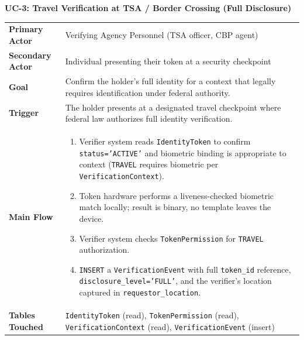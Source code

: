 \documentclass[11pt,letterpaper]{article}
\newcommand{\entity}[1]{\texttt{\color{navydark}#1}}
\newcommand{\usecase}[2]{%
  \needspace{3\baselineskip}%
  \vspace{6pt}%
  \noindent\colorbox{tabheader}{\parbox{\dimexpr\textwidth-2\fboxsep}{%
    \color{white}\small\bfseries\textsc{#1:} \mdseries #2}}%
  \nopagebreak[4]%
  \vspace{2pt}%
  \nopagebreak[4]%
}
\begin{document}
\usecase{UC-3}{Travel Verification at TSA / Border Crossing (Full Disclosure)}
\noindent\begin{xltabular}{\textwidth}{>{\bfseries}p{1.4in} >{\RaggedRight\arraybackslash}X}
Primary Actor & Verifying Agency Personnel (TSA officer, CBP agent) \\
Secondary Actor & Individual presenting their token at a security checkpoint \\
Goal & Confirm the holder's full identity for a context that legally requires identification under federal authority. \\
Trigger & The holder presents at a designated travel checkpoint where federal law authorizes full identity verification. \\
Main Flow &
\begin{enumerate}
  \item Verifier system reads \entity{IdentityToken} to confirm \texttt{status='ACTIVE'} and biometric binding is appropriate to context (\texttt{TRAVEL} requires biometric per \entity{VerificationContext}).
  \item Token hardware performs a liveness-checked biometric match locally; result is binary, no template leaves the device.
  \item Verifier system checks \entity{TokenPermission} for \texttt{TRAVEL} authorization.
  \item \texttt{INSERT} a \entity{VerificationEvent} with full \texttt{token\_id} reference, \texttt{disclosure\_level='FULL'}, and the verifier's location captured in \texttt{requestor\_location}.
\end{enumerate} \\
Tables Touched & \entity{IdentityToken} (read), \entity{TokenPermission} (read), \entity{VerificationContext} (read), \entity{VerificationEvent} (insert) \\
\end{xltabular}
\end{document}
